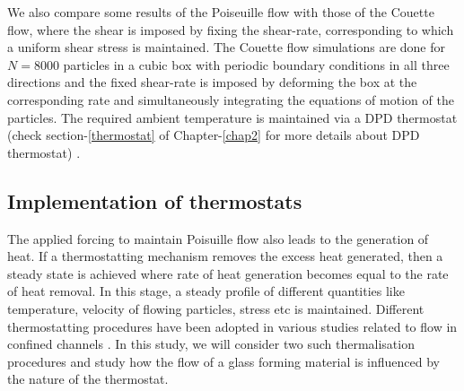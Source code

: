 We also compare some results of the Poiseuille flow with those of the Couette flow, where the shear is imposed by fixing the shear-rate, corresponding to which a uniform shear stress is maintained. The Couette flow simulations are done for $N=8000$ particles in a cubic box with periodic boundary conditions in all three directions and the fixed shear-rate is imposed by deforming the box at the corresponding rate \cite{PhysRevE.102.023002} and simultaneously integrating the equations of motion of the particles. The required ambient temperature is maintained via a DPD thermostat (check section-\ref{thermostat} of Chapter-\ref{chap2} for more details about DPD thermostat) \cite{shrivastav2016yielding}.

\subsection{Implementation of thermostats}

The applied forcing to maintain Poisuille flow also leads to the generation of heat. If a thermostatting mechanism removes the excess heat generated, then a steady state is achieved where rate of heat generation becomes equal to the rate of heat removal. In this stage, a steady profile of different quantities like temperature, velocity of flowing particles, stress etc is maintained. Different thermostatting procedures have been adopted in various studies related to flow in confined channels \cite{hartkamp2017,luding2007,yethiraj1997}. In this study, we will consider two such thermalisation procedures and study how the flow of a glass forming material is influenced by the nature of the thermostat.

